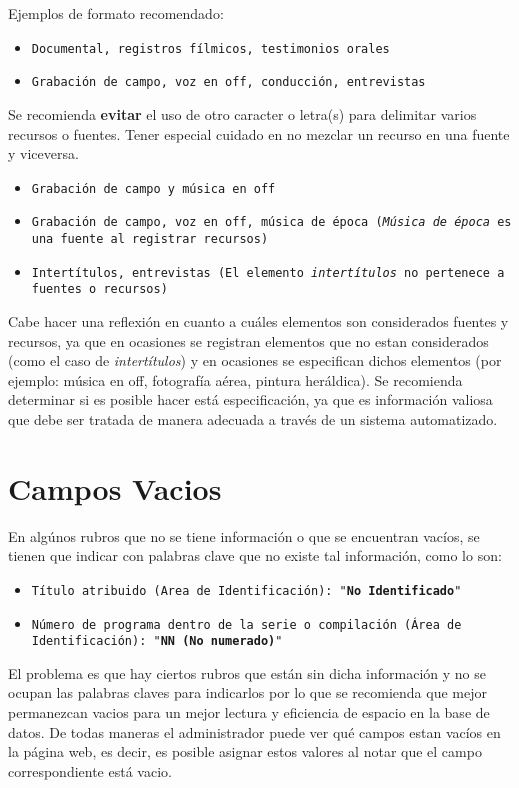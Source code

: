\documentclass[10pt,letterpaper]{article}
\begin{document}
Ejemplos de formato recomendado:
{\color{Blue}
\begin{itemize}
	\item \texttt{Documental, registros fílmicos, testimonios orales}
	\item \texttt{Grabación de campo, voz en off, conducción, entrevistas}
\end{itemize}
}

Se recomienda \textbf{evitar} el uso de otro caracter o letra(s) para delimitar varios recursos o fuentes. Tener especial cuidado en no mezclar un recurso en una fuente y viceversa.
{\color{Red}
\begin{itemize}
	\item \texttt{Grabación de campo y música en off}
	\item \texttt{Grabación de campo, voz en off, música de época (\textit{Música de época} es una fuente al registrar recursos)}
	\item \texttt{Intertítulos, entrevistas (El elemento \textit{intertítulos} no pertenece a fuentes o recursos)}
\end{itemize}
}

Cabe hacer una reflexión en cuanto a cuáles elementos son considerados fuentes y recursos, ya que en ocasiones se registran elementos que no estan considerados (como el caso de \textit{intertítulos}) y en ocasiones se especifican dichos elementos (por ejemplo: música en off, fotografía aérea, pintura heráldica). Se recomienda determinar si es posible hacer está especificación, ya que es información valiosa que debe ser tratada de manera adecuada a través de un sistema automatizado.


\section{Campos Vacios}
En algúnos rubros que no se tiene información o que se encuentran vacíos, se tienen que indicar con palabras clave que no existe tal información, como lo son:
\begin{itemize}
	\item \texttt{Título atribuido (Area de Identificación): "\textbf{No Identificado}"}
	\item \texttt{Número de programa dentro de la serie o compilación (Área de Identificación): "\textbf{NN (No numerado)}"}
\end{itemize}

El problema es que hay ciertos rubros que están sin dicha información y no se ocupan las palabras claves para indicarlos por lo que se recomienda que mejor permanezcan vacios para un mejor lectura y eficiencia de espacio en la base de datos.
De todas maneras el administrador puede ver qué campos estan vacíos en la página web, es decir, es posible asignar estos valores al notar que el campo correspondiente está vacio.
\end{document}
